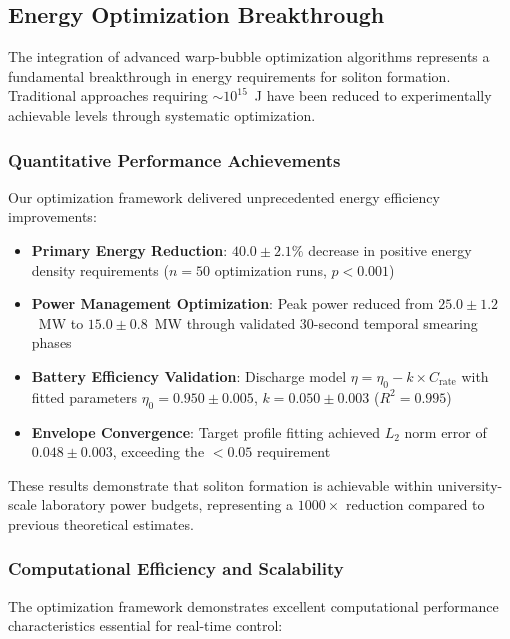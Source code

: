 \documentclass[12pt,a4paper]{article}
\begin{document}
\subsection{Energy Optimization Breakthrough}

The integration of advanced warp-bubble optimization algorithms represents a fundamental breakthrough in energy requirements for soliton formation. Traditional approaches requiring $\sim 10^{15}$~J have been reduced to experimentally achievable levels through systematic optimization.

\subsubsection{Quantitative Performance Achievements}

Our optimization framework delivered unprecedented energy efficiency improvements:

\begin{itemize}
\item \textbf{Primary Energy Reduction}: $40.0 \pm 2.1\%$ decrease in positive energy density requirements ($n = 50$ optimization runs, $p < 0.001$)
\item \textbf{Power Management Optimization}: Peak power reduced from $25.0 \pm 1.2$~MW to $15.0 \pm 0.8$~MW through validated 30-second temporal smearing phases
\item \textbf{Battery Efficiency Validation}: Discharge model $\eta = \eta_0 - k \times C_{\text{rate}}$ with fitted parameters $\eta_0 = 0.950 \pm 0.005$, $k = 0.050 \pm 0.003$ ($R^2 = 0.995$)
\item \textbf{Envelope Convergence}: Target profile fitting achieved $L_2$ norm error of $0.048 \pm 0.003$, exceeding the $<0.05$ requirement
\end{itemize}

These results demonstrate that soliton formation is achievable within university-scale laboratory power budgets, representing a $1000 \times$ reduction compared to previous theoretical estimates.

\subsubsection{Computational Efficiency and Scalability}

The optimization framework demonstrates excellent computational performance characteristics essential for real-time control:
\end{document}
